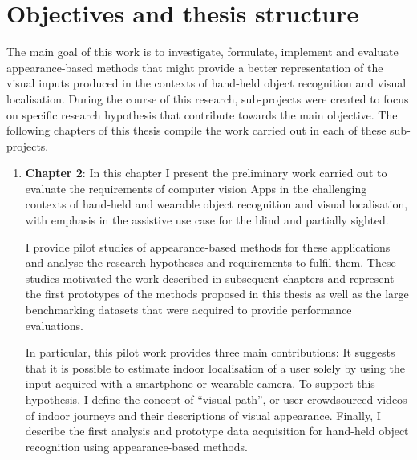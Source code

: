 \section{Objectives and thesis structure}

The main goal of this work is to investigate, formulate, implement and evaluate appearance-based methods that might provide a better representation of the visual inputs produced in the contexts of hand-held object recognition and visual localisation. During the course of this research, sub-projects were created to focus on specific research hypothesis that contribute towards the main objective. The following chapters of this thesis compile the work carried out in each of these sub-projects.


\begin{enumerate}

\item \textbf{Chapter 2}: In this chapter I present the preliminary work carried out to evaluate the requirements of computer vision Apps in the challenging contexts of hand-held and wearable object recognition and visual localisation, with emphasis in the assistive use case for the blind and partially sighted. %

I provide pilot studies of appearance-based methods for these applications and analyse the research hypotheses and requirements to fulfil them. These studies motivated the work described in subsequent chapters and represent the first prototypes of the methods proposed in this thesis as well as the large benchmarking datasets that were acquired to provide performance evaluations.

In particular, this pilot work provides three main contributions: It suggests that it is possible to estimate indoor localisation of a user solely by using the input acquired with a smartphone or wearable camera. To support this hypothesis, I define the concept of ``visual path'', or user-crowdsourced videos of indoor journeys and their descriptions of visual appearance. Finally, I describe the first analysis and prototype data acquisition for hand-held object recognition using appearance-based methods.



\end{enumerate}
